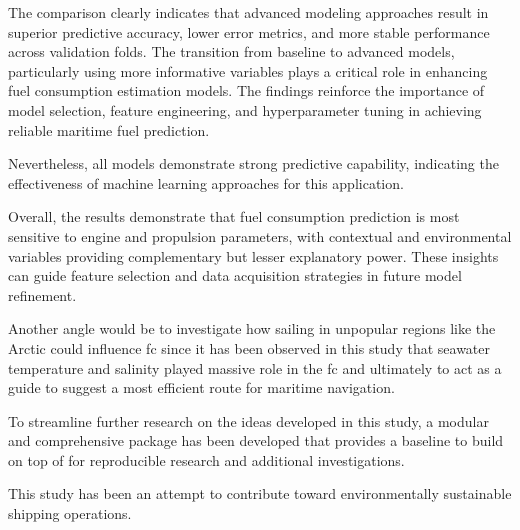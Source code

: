 The comparison clearly indicates that advanced modeling approaches result in superior predictive accuracy, lower error metrics, and more stable performance across validation folds. The transition from baseline to advanced models, particularly using more informative variables plays a critical role in enhancing fuel consumption estimation models. The findings reinforce the importance of model selection, feature engineering, and hyperparameter tuning in achieving reliable maritime fuel prediction.

Nevertheless, all models demonstrate strong predictive capability, indicating the effectiveness of machine learning approaches for this application.

Overall, the results demonstrate that fuel consumption prediction is most sensitive to 
engine and propulsion parameters, with contextual and environmental 
variables providing complementary but lesser explanatory power. 
These insights can guide feature selection and data acquisition strategies in future model refinement.

Another angle would be to investigate how sailing in unpopular regions like the Arctic could influence \ac{fc} since it has been observed in this study that seawater temperature and salinity played massive role in the \ac{fc} and ultimately to act as a guide to suggest a most efficient route for maritime navigation. 

To streamline further research on the ideas developed in this study, a modular and comprehensive package has been developed that provides a baseline to build on top of for reproducible research and additional investigations.   

This study has been an attempt to contribute toward environmentally sustainable shipping operations. 
